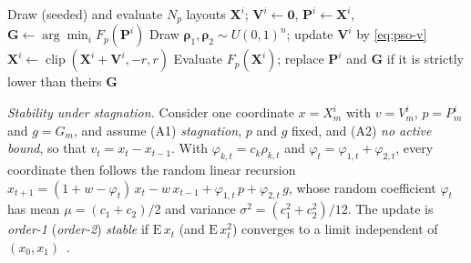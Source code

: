 \begin{algorithm}[!t]
\caption{PSO as implemented ($N_p(T+1)$ evaluations)}
\label{alg:pso}
\small
\begin{algorithmic}[1]
\State Draw (seeded) and evaluate $N_p$ layouts $\mathbf X^i$; $\mathbf V^i\gets\mathbf 0$, $\mathbf P^i\gets\mathbf X^i$, $\mathbf G\gets\arg\min_i F_p(\mathbf P^i)$
    \State Draw $\boldsymbol\rho_1,\boldsymbol\rho_2\sim U(0,1)^n$; update $\mathbf V^i$ by \eqref{eq:pso-v} 
    \State $\mathbf X^i\gets\operatorname{clip}(\mathbf X^i+\mathbf V^i,-r,r)$ 
    \State Evaluate $F_p(\mathbf X^i)$; replace $\mathbf P^i$ and $\mathbf G$ if it is strictly lower than theirs
\EndFor
\State \Return $\mathbf G$
\end{algorithmic}
\end{algorithm}

\emph{Stability under stagnation.} Consider one coordinate $x=X^i_m$ with $v=V^i_m$, $p=P^i_m$ and $g=G_m$, and assume (A1) \emph{stagnation}, $p$ and $g$ fixed, and (A2) \emph{no active bound}, so that $v_t=x_t-x_{t-1}$. With $\varphi_{k,t}=c_k\rho_{k,t}$ and $\varphi_t=\varphi_{1,t}+\varphi_{2,t}$, every coordinate then follows the random linear recursion $x_{t+1}=(1+w-\varphi_t)\,x_t-w\,x_{t-1}+\varphi_{1,t}\,p+\varphi_{2,t}\,g$, whose random coefficient $\varphi_t$ has mean $\mu=(c_1+c_2)/2$ and variance $\sigma^2=(c_1^2+c_2^2)/12$. The update is \emph{order-1} (\emph{order-2}) \emph{stable} if $\mathrm E\,x_t$ (and $\mathrm E\,x_t^2$) converges to a limit independent of $(x_0,x_1)$~\cite{Poli2009}.

